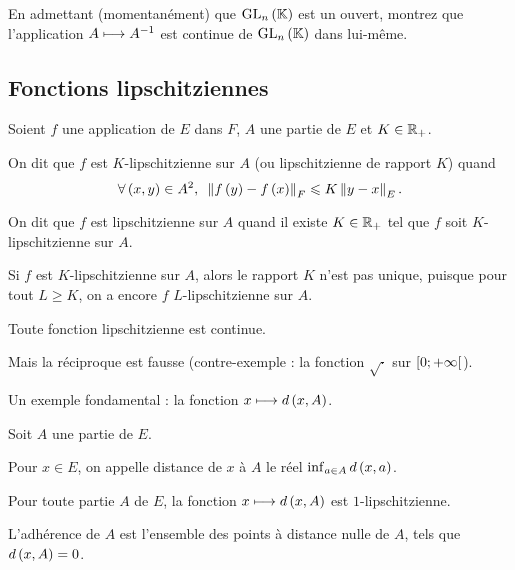 \begin{exo}
En admettant (momentanément) que \(\GL{n}\) est un ouvert, montrez que l'application \(A\longmapsto A^{-1}\) est continue de \(\GL{n}\) dans lui-même.
\end{exo}

\subsection{Fonctions lipschitziennes}

\begin{defi}
Soient \(f\) une application de \(E\) dans \(F\), \(A\) une partie de \(E\) et \(K\in\mathbb{R}_+\).

On dit que \(f\) est \(K\)-lipschitzienne sur \(A\) (ou lipschitzienne de rapport \(K\)) quand \[\quantifs{\forall\paren{x,y}\in A^2}\norme{f\paren{y}-f\paren{x}}_F\leq K\norme{y-x}_E.\]

On dit que \(f\) est lipschitzienne sur \(A\) quand il existe \(K\in\mathbb{R}_+\) tel que \(f\) soit \(K\)-lipschitzienne sur \(A\).
\end{defi}

\begin{rem}
Si \(f\) est \(K\)-lipschitzienne sur \(A\), alors le rapport \(K\) n'est pas unique, puisque pour tout \(L\geq K\), on a encore \(f\) \(L\)-lipschitzienne sur \(A\).
\end{rem}

\begin{prop}
Toute fonction lipschitzienne est continue.
\end{prop}

Mais la réciproque est fausse (contre-exemple : la fonction \(\sqrt{\cdot}\) sur \(\left[0;+\infty\right[\)).

Un exemple fondamental : la fonction \(x\longmapsto d\left(x,A\right)\).

\begin{defi}
Soit \(A\) une partie de \(E\).

Pour \(x\in E\), on appelle distance de \(x\) à \(A\) le réel \(\inf_{a\in A}d\left(x,a\right)\).
\end{defi}

\begin{prop}
Pour toute partie \(A\) de \(E\), la fonction \(x\longmapsto d\left(x,A\right)\) est \(1\)-lipschitzienne.

L'adhérence de \(A\) est l'ensemble des points à distance nulle de \(A\), \ie tels que \(d\left(x,A\right)=0\).
\end{prop}


